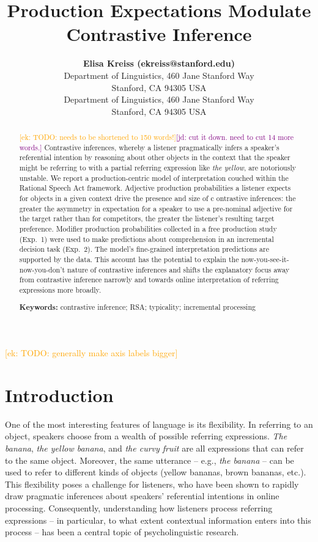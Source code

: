 \documentclass[10pt,letterpaper]{article}
\title{Production Expectations Modulate Contrastive Inference}
\author{{\large \bf Elisa Kreiss (ekreiss@stanford.edu)} \\
  Department of Linguistics, 460 Jane Stanford Way \\
  Stanford, CA 94305 USA
  \AND {\large \bf Judith Degen (jdegen@stanford.edu)} \\
  Department of Linguistics, 460 Jane Stanford Way \\
  Stanford, CA 94305 USA}
\newcommand{\ek}[1]{\textcolor{Orange}{[ek: #1]}}
\newcommand{\jd}[1]{\textcolor{Purple}{[jd: #1]}}
\begin{document}
\maketitle

\ek{TODO: generally make axis labels bigger}

\begin{abstract}
\ek{TODO: needs to be shortened to 150 words!}\jd{cut it down. need to cut 14 more words.}
Contrastive inferences, whereby a listener pragmatically infers a speaker's  referential intention by reasoning about other objects in the context that the speaker might be referring to with a partial referring expression like \emph{the yellow}, are notoriously unstable. We report a production-centric model of interpretation couched within the Rational Speech Act framework. Adjective production probabilities a listener expects for objects in a given context drive the presence and size of c	ontrastive inferences: the greater the asymmetry in expectation for a speaker to use a pre-nominal adjective for the target rather than for competitors, the greater the listener's resulting  target preference. Modifier production probabilities collected in a free production study (Exp.~1) were used to make predictions about comprehension in an incremental decision task (Exp.~2). The model's fine-grained interpretation predictions are supported by the data. This account has the potential to explain the now-you-see-it-now-you-don't nature of contrastive inferences and shifts the explanatory focus away from contrastive inference narrowly and towards online interpretation of referring expressions more broadly.


\textbf{Keywords:} 
contrastive inference; RSA; typicality; incremental processing
\end{abstract}

\section{Introduction}

One of the most interesting features of language is its flexibility. In referring to an object, speakers choose from a wealth of possible referring expressions. \textit{The banana}, \textit{the yellow banana}, and \textit{the curvy fruit}  are all expressions that can refer to the same object. Moreover, the same utterance -- e.g., \textit{the banana} -- can be used to refer to different kinds of objects (yellow bananas, brown bananas, etc.). This flexibility poses a challenge for listeners, who have been shown to rapidly draw pragmatic inferences about speakers' referential intentions in online processing. Consequently, understanding how listeners process referring expressions -- in particular, to what extent contextual information enters into this process -- has been a central topic of psycholinguistic research.
\end{document}
